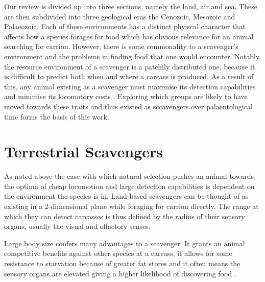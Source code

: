 \documentclass[a4paper,12pt]{article}
\begin{document}
Our review is divided up into three sections, namely the land, air and sea. 
These are then subdivided into three geological eras the Cenozoic, Mesozoic and Palaeozoic. 
Each of these environments has a distinct phyiscal character that affects how a species forages for food which has obvious relevance for an animal searching for carrion.  
However, there is some commonality to a scavenger's environment and the problems in finding food that one would encounter. 
Notably, the resource environment of a scavenger is a patchily distributed one, because it is difficult to predict both when and where a carcass is produced. 
As a result of this, any animal existing as a scavenger must maximise its detection capabilities and minimise its locomotory costs \citep{ruxton2004obligate}.
Exploring which groups are likely to have moved towards these traits and thus existed as sccavengers over palaentological time forms the basis of this work.

\section{Terrestrial Scavengers}
As noted above the ease with which natural selection pushes an animal towards the optima of cheap locomotion and large detection capabilities is dependent on the environment the species is in. 
Land-based scavengers can be thought of as existing in a 2-dimensional plane while foraging for carrion directly. 
The range at which they can detect carcasses is thus defined by the radius of their sensory organs, usually the visual and olfactory senses. 

Large body size confers many advantages to a scavenger. 
It grants an animal competitive benefits against other species at a carcass, it allows for some resistance to starvation because of greater fat stores and it often means the sensory organs are elevated giving a higher likelihood of discovering food \citep{farlow1994speculations}. 
\end{document}
